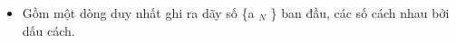 \begin{itemize}
	\item     Gồm một dòng duy nhất ghi ra dãy số \{a    $_     N    $    \} ban đầu, các số cách nhau bởi dấu cách.   
\end{itemize}